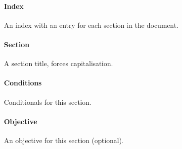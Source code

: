 \paragraph{Index}\label{index}

An index with an entry for each section in the document.

\begin{Shaded}
\begin{Highlighting}[]
\end{Highlighting}
\end{Shaded}

\paragraph{Section}\label{section}

A section title, forces capitalisation.

\begin{Shaded}
\begin{Highlighting}[]
\NormalTok{\#section("Cup of Tea preparation")[}
\NormalTok{]}
\end{Highlighting}
\end{Shaded}

\paragraph{Conditions}\label{conditions}

Conditionals for this section.

\begin{Shaded}
\begin{Highlighting}[]
\NormalTok{\#condition[}
\NormalTok{]}
\end{Highlighting}
\end{Shaded}

\paragraph{Objective}\label{objective}

An objective for this section (optional).

\begin{Shaded}
\begin{Highlighting}[]
\end{Highlighting}
\end{Shaded}

